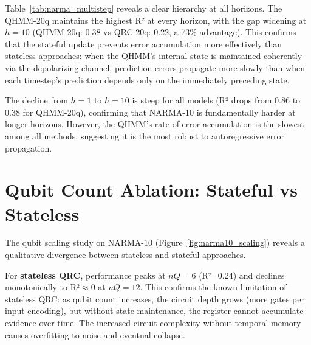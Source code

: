 
Table~\ref{tab:narma_multistep} reveals a clear hierarchy at all horizons.
The QHMM-20q maintains the highest R² at every horizon, with the gap
widening at $h=10$ (QHMM-20q: 0.38 vs QRC-20q: 0.22, a 73\% advantage).
This confirms that the stateful update prevents error accumulation more
effectively than stateless approaches: when the QHMM's internal state
is maintained coherently via the depolarizing channel, prediction errors
propagate more slowly than when each timestep's prediction depends only
on the immediately preceding state.


The decline from $h=1$ to $h=10$ is steep for all models (R² drops from
0.86 to 0.38 for QHMM-20q), confirming that NARMA-10 is fundamentally
harder at longer horizons. However, the QHMM's rate of error accumulation
is the slowest among all methods, suggesting it is the most robust to
autoregressive error propagation.



\section{Qubit Count Ablation: Stateful vs Stateless}
\label{sec:qubit_ablation}


The qubit scaling study on NARMA-10 (Figure~\ref{fig:narma10_scaling})
reveals a qualitative divergence between stateless and stateful approaches.


For \textbf{stateless QRC}, performance peaks at $nQ=6$ (R²=0.24) and
declines monotonically to R²$\approx$0 at $nQ=12$. This confirms the
known limitation of stateless QRC: as qubit count increases, the circuit
depth grows (more gates per input encoding), but without state maintenance,
the register cannot accumulate evidence over time. The increased circuit
complexity without temporal memory causes overfitting to noise and
eventual collapse.


